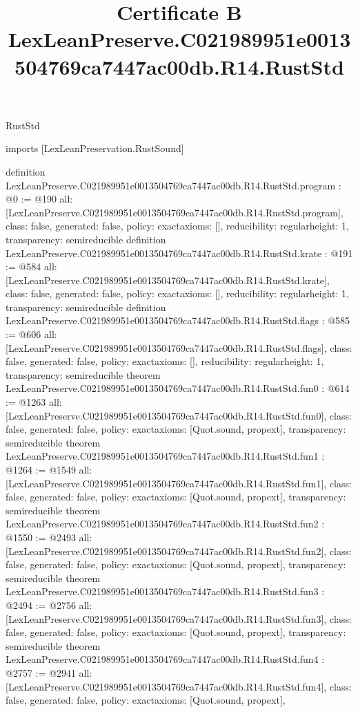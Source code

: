 \begin{lexlean}{RustStd}
\title{Certificate B LexLeanPreserve.C021989951e0013504769ca7447ac00db.R14.RustStd}
\begin{coremodule}
imports [LexLeanPreservation.RustSound]

definition LexLeanPreserve.C021989951e0013504769ca7447ac00db.R14.RustStd.program : @0 := @190 {
  all: [LexLeanPreserve.C021989951e0013504769ca7447ac00db.R14.RustStd.program],
  class: false,
  generated: false,
  policy: exact{axioms: []},
  reducibility: regular{height: 1},
  transparency: semireducible
}
definition LexLeanPreserve.C021989951e0013504769ca7447ac00db.R14.RustStd.krate : @191 := @584 {
  all: [LexLeanPreserve.C021989951e0013504769ca7447ac00db.R14.RustStd.krate],
  class: false,
  generated: false,
  policy: exact{axioms: []},
  reducibility: regular{height: 1},
  transparency: semireducible
}
definition LexLeanPreserve.C021989951e0013504769ca7447ac00db.R14.RustStd.flags : @585 := @606 {
  all: [LexLeanPreserve.C021989951e0013504769ca7447ac00db.R14.RustStd.flags],
  class: false,
  generated: false,
  policy: exact{axioms: []},
  reducibility: regular{height: 1},
  transparency: semireducible
}
theorem LexLeanPreserve.C021989951e0013504769ca7447ac00db.R14.RustStd.fun0 : @614 := @1263 {
  all: [LexLeanPreserve.C021989951e0013504769ca7447ac00db.R14.RustStd.fun0],
  class: false,
  generated: false,
  policy: exact{axioms: [Quot.sound, propext]},
  transparency: semireducible
}
theorem LexLeanPreserve.C021989951e0013504769ca7447ac00db.R14.RustStd.fun1 : @1264 := @1549 {
  all: [LexLeanPreserve.C021989951e0013504769ca7447ac00db.R14.RustStd.fun1],
  class: false,
  generated: false,
  policy: exact{axioms: [Quot.sound, propext]},
  transparency: semireducible
}
theorem LexLeanPreserve.C021989951e0013504769ca7447ac00db.R14.RustStd.fun2 : @1550 := @2493 {
  all: [LexLeanPreserve.C021989951e0013504769ca7447ac00db.R14.RustStd.fun2],
  class: false,
  generated: false,
  policy: exact{axioms: [Quot.sound, propext]},
  transparency: semireducible
}
theorem LexLeanPreserve.C021989951e0013504769ca7447ac00db.R14.RustStd.fun3 : @2494 := @2756 {
  all: [LexLeanPreserve.C021989951e0013504769ca7447ac00db.R14.RustStd.fun3],
  class: false,
  generated: false,
  policy: exact{axioms: [Quot.sound, propext]},
  transparency: semireducible
}
theorem LexLeanPreserve.C021989951e0013504769ca7447ac00db.R14.RustStd.fun4 : @2757 := @2941 {
  all: [LexLeanPreserve.C021989951e0013504769ca7447ac00db.R14.RustStd.fun4],
  class: false,
  generated: false,
  policy: exact{axioms: [Quot.sound, propext]},
}
\end{coremodule}
\end{lexlean}
